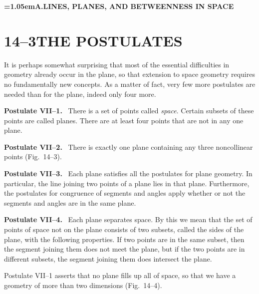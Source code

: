 \documentclass[11pt]{book}
\theoremstyle{bkplain}
\theoremstyle{XIplainnote}
\theoremstyle{bkplain}
\newcommand{\XIVpart}[1]{%
  \par\addvspace{1.5\baselineskip}\nopagebreak
  \begin{center}\bfseries\spaceskip=1.05em\relax #1\end{center}%
  \nopagebreak\addvspace{0.8\baselineskip}}
\newenvironment{postulate}[1]%
  {\par\addvspace{1.1\topsep}\noindent\textbf{Postulate #1.}\ \ignorespaces}%
  {\par\addvspace{1.1\topsep}}
\theoremstyle{bkplain}
\begin{document}
\XIVpart{A.\quad LINES, PLANES, AND BETWEENNESS IN SPACE}

\section*{14--3\quad THE POSTULATES}

It is perhaps somewhat surprising that most of the essential difficulties in
geometry already occur in the plane, so that extension to space geometry
requires no fundamentally new concepts. As a matter of fact, very few more
postulates are needed than for the plane, indeed only four more.

\begin{postulate}{VII--1}
There is a set of points called \emph{space}. Certain subsets of these points
are called planes. There are at least four points that are not in any one plane.
\end{postulate}

\begin{postulate}{VII--2}
There is exactly one plane containing any three noncollinear points
(Fig.~14--3).
\end{postulate}

\FIGXIVTHREE

\begin{postulate}{VII--3}
Each plane satisfies all the postulates for plane geometry. In particular, the
line joining two points of a plane lies in that plane. Furthermore, the
postulates for congruence of segments and angles apply whether or not the
segments and angles are in the same plane.
\end{postulate}

\begin{postulate}{VII--4}
Each plane separates space. By this we mean that the set of points of space not
on the plane consists of two subsets, called the sides of the plane, with the
following properties. If two points are in the same subset, then the segment
joining them does not meet the plane, but if the two points are in different
subsets, the segment joining them does intersect the plane.
\end{postulate}

Postulate VII--1 asserts that no plane fills up all of space, so that we have a
geometry of more than two dimensions (Fig.~14--4).
\end{document}
